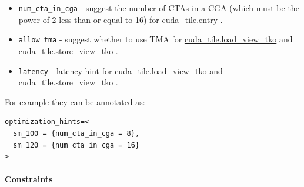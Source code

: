\documentclass{article}
\begin{document}
\begin{itemize}
\item \texttt{num\_cta\_in\_cga} - suggest the number of CTAs in a CGA (which must be the power of 2 less than or equal to 16) for \href{https://docs.nvidia.com/cuda/tile-ir/latest/sections/operations.html#op-cuda-tile-entry}{cuda\_tile.entry} .
\item \texttt{allow\_tma} - suggest whether to use TMA for \href{https://docs.nvidia.com/cuda/tile-ir/latest/sections/operations.html#op-cuda-tile-load-view-tko}{cuda\_tile.load\_view\_tko} and \href{https://docs.nvidia.com/cuda/tile-ir/latest/sections/operations.html#op-cuda-tile-store-view-tko}{cuda\_tile.store\_view\_tko} .
\item \texttt{latency} - latency hint for \href{https://docs.nvidia.com/cuda/tile-ir/latest/sections/operations.html#op-cuda-tile-load-view-tko}{cuda\_tile.load\_view\_tko} and \href{https://docs.nvidia.com/cuda/tile-ir/latest/sections/operations.html#op-cuda-tile-store-view-tko}{cuda\_tile.store\_view\_tko} .

\end{itemize}
For example they can be annotated as:


\begin{lstlisting}
optimization_hints=<
  sm_100 = {num_cta_in_cga = 8},
  sm_120 = {num_cta_in_cga = 16}
>
\end{lstlisting}


\paragraph{Constraints}
\end{document}
